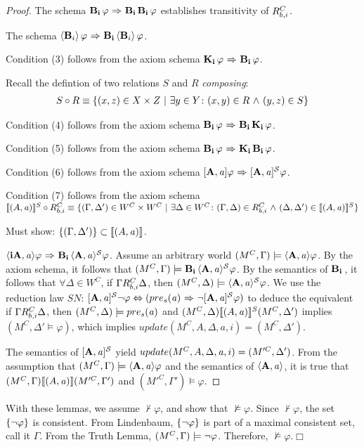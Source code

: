 \begin{proof}
	The schema $\mathbf{B}_{\mathbf{i}}\,\varphi{\ \Rightarrow \ }\mathbf{B}_{\mathbf{i}}\,\mathbf{B}_{\mathbf{i}}\,\varphi$ establishes transitivity of $R_{b,i}^C$.
	
	The schema $\langle \mathbf{B}_{i} \rangle\,\varphi{\ \Rightarrow \ }\mathbf{B}_{\mathbf{i}}\,\langle \mathbf{B}_{i} \rangle\,\varphi$.
	
	Condition (3) follows from the axiom schema $\mathbf{K}_{\mathbf{i}}\,\varphi {\ \Rightarrow \ } \mathbf{B}_{\mathbf{i}}\,\varphi$.
	
Recall the defintion of two relations $S$ and $R$ \emph{composing}:
	\begin{eqnarray}
	 S \circ R \equiv \{(x,z)\in X\times Z\ |\ \exists y \in Y \colon (x,y)\in R {\ \wedge \ } (y,z) \in S\}
	\end{eqnarray}
	
	Condition (4) follows from the axiom schema $\mathbf{B}_{\mathbf{i}}\,\varphi{\ \Rightarrow \ }\mathbf{B}_{\mathbf{i}}\,\mathbf{K}_{\mathbf{i}}\,\varphi$.
	
	Condition (5) follows from the axiom schema $\mathbf{B}_{\mathbf{i}}\,\varphi {\ \Rightarrow \ } \mathbf{K}_{\mathbf{i}}\,\mathbf{B}_{\mathbf{i}}\,\varphi$.
	
	Condition (6) follows from the axiom schema $\mathbf{[A,\mathit{a}]}\varphi{\ \Rightarrow \ }\mathbf{[A,\mathit{a}]^\mathcal{S}}\varphi$.
	
	Condition (7) follows from the axiom schema \\
	$\llbracket (A,\mathit{a}) \rrbracket^S \circ R_{b,i}^C \equiv \{(\Gamma,\Delta')\in W^C\times W^C\ |\ \exists \Delta \in W^C \colon (\Gamma,\Delta)\in R_{b,i}^C {\ \wedge \ } (\Delta,\Delta') \in \llbracket(A,\mathit{a}) \rrbracket^S\}$
	
	
	Must show: $\{(\Gamma,\Delta')\}\subset \llbracket (A,\mathit{a}) \rrbracket$.
	
	$\mathbf{\langle iA,\mathit{a}\rangle}\varphi{\ \Rightarrow \ }\mathbf{B}_{\mathbf{i}}\,\mathbf{\langle A,\mathit{a}\rangle^\mathcal{S}}\varphi$. Assume an arbitrary world $(M^C,\Gamma)\models\mathbf{\langle A,\mathit{a}\rangle}\varphi$. By the axiom schema, it follows that $(M^C,\Gamma)\models\mathbf{B}_{\mathbf{i}}\,\mathbf{\langle A,\mathit{a}\rangle^\mathcal{S}}\varphi$. By the semantics of $\mathbf{B}_{\mathbf{i}}\,$, it follows that $\forall \Delta\in W^C$, if $\Gamma R_{b,i}^C\Delta$, then $(M^C,\Delta)\models\mathbf{\langle A,\mathit{a}\rangle^\mathcal{S}}\varphi$. We use the reduction law $SN$: $\mathbf{[A,\mathit{a}]^\mathcal{S}}{\neg}\varphi \Leftrightarrow (pre_s(\mathit{a}) {\ \Rightarrow \ } {\neg} \mathbf{[A,\mathit{a}]^\mathcal{S}}\varphi)$ to deduce the equivalent if $\Gamma R_{b,i}^C\Delta$, then $(M^C,\Delta)\models pre_s(\mathit{a})$ and $(M^C,\Delta) \llbracket (A,\mathit{a}) \rrbracket^S (M^C,\Delta')$ implies $(M^C,\Delta'\models\varphi)$, which implies $update(M^C,A,\Delta,a,i)=(M^C,\Delta')$.
	
	
	The semantics of $\mathbf{[A,\mathit{a}]^\mathcal{S}}$ yield $update(M^C, A, \Delta,\mathit{a}, i)=(M'^C,\Delta')$. From the assumption that $(M^C,\Gamma)\models\mathbf{\langle A,\mathit{a}\rangle}\varphi$ and the semantics of $\mathbf{\langle A,\mathit{a}\rangle}$, it is true that $(M^C,\Gamma) \llbracket (A,\mathit{a}) \rrbracket (M'^C,\Gamma')$ and $(M'^C,\Gamma') \models \varphi$. 
\end{proof}
With these lemmas, we assume $\not\vdash\varphi$, and show that $\not\models\varphi$. Since $\not\vdash\varphi$, the set $\{{\neg}\varphi\}$ is consistent. From Lindenbaum, $\{{\neg}\varphi\}$ is part of a maximal consistent set, call it $\Gamma$. From the Truth Lemma, $(M^C,\Gamma)\models{\neg}\varphi$. Therefore, $\not\models\varphi$.$\Box$

